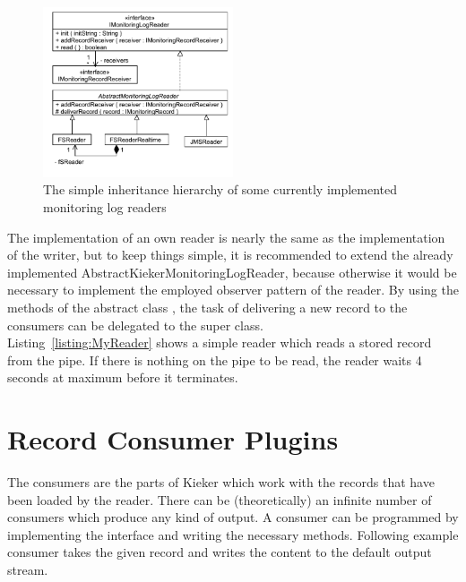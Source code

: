 		\begin{figure}[H]
			\begin{centering}
				\includegraphics[width=0.5\textwidth]{images/kieker_readerimpls}
				\caption{The simple inheritance hierarchy of some currently implemented monitoring log readers}
				\label{Figure:ReaderHierarchy}
			\end{centering}
		\end{figure}

		\noindent The implementation of an own reader is nearly the same as the implementation of the writer, but to keep things simple, it is recommended to extend the already implemented AbstractKiekerMonitoringLogReader, because otherwise it would be necessary to implement the employed observer pattern of the reader. By using the methods of the abstract class , the task of delivering a new record to the consumers can be delegated to the super class.\\
		Listing~\ref{listing:MyReader} shows a simple reader which reads a stored record from the pipe. If there is nothing on the pipe to be read, the reader waits 4 seconds at maximum before it terminates.

		\setJavaCodeListing
		

	\section{Record Consumer Plugins}

		The consumers are the parts of Kieker which work with the records that have been loaded by the reader. There can be (theoretically) an infinite number of consumers which produce any kind of output. A consumer can be programmed by implementing the interface  and writing the necessary methods. Following example consumer takes the given record and writes the content to the default output stream.

